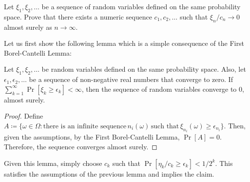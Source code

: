 \begin{problem}{3}
    Let $\xi_1, \xi_2,\ldots$ be a sequence of random variables defined on the same probability space. Prove that there exists a numeric sequence $c_1,c_2,\ldots$ such that $\xi_n/c_n \to 0$ almost surely as $n\to\infty$.
\end{problem}
\begin{solution}
    Let us first show the following lemma which is a simple consequence of the First Borel-Cantelli Lemma:
    \begin{lemma}
        Let $\xi_1,\xi_2,\ldots$ be random variables defined on the same probability space. Also, let $\epsilon_1,\epsilon_2,\ldots$ be a sequence of non-negative real numbers that converge to zero. If $\sum_{k=1}^\infty \Pr[\xi_k \geq \epsilon_k] < \infty$, then the sequence of random variables converge to 0, almost surely. 
    \end{lemma}
    \begin{proof}
        Define $A \coloneqq \{ \omega \in \Omega: \text{there is an infinite sequence}\,n_i(\omega)\,\text{such that}\,\xi_{n_i}(\omega) \geq \epsilon_{n_i} \}$. Then, given the assumptions, by the First Borel-Cantelli Lemma, $\Pr[A] = 0$. Therefore, the sequence converges almost surely. 
    \end{proof}
    Given this lemma, simply choose $c_k$ such that $\Pr[\eta_k / c_k \geq \epsilon_k] < 1/2^k$. This satisfies the assumptions of the previous lemma and implies the claim. 
\end{solution}


